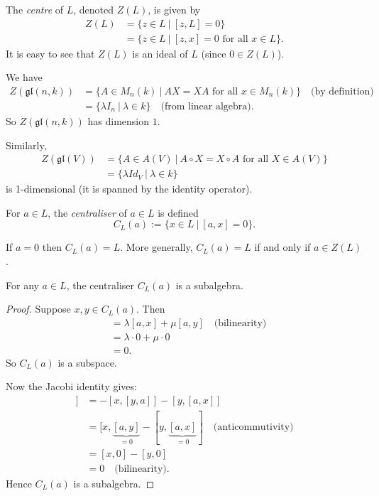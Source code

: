 \begin{definition}
	The \emph{centre} of $L$, denoted $Z(L)$, is given by
	\begin{align*}
		Z(L) &= \{z \in L\ |\ [z, L] = 0\} \\
			 &= \{z \in L\ |\ [z, x] = 0 \text{ for all } x \in L\}.
	\end{align*}
	It is easy to see that $Z(L)$ is an ideal of $L$ (since $0 \in Z(L)$).
\end{definition}

\begin{example}
	We have
	\begin{align*}
		Z(\mathfrak{gl}(n, k)) &= \{A \in M_n(k)\ |\ AX = XA \text{ for all } x \in M_n(k)\} \quad \text{(by definition)} \\
			&= \{\lambda I_n\ |\ \lambda \in k\} \quad \text{(from linear algebra)}.
	\end{align*}
	So $Z(\mathfrak{gl}(n, k))$ has dimension $1$.
	
	Similarly,
	\begin{align*}
		Z(\mathfrak{gl}(V)) &= \{A \in A(V)\ |\ A \circ X = X \circ A \text{ for all } X \in A(V)\} \\
			&= \{\lambda Id_V\ |\ \lambda \in k\}
	\end{align*}
	is 1-dimensional (it is spanned by the identity operator).
\end{example}

\begin{definition}
	For $a \in L$, the \emph{centraliser} of $a \in L$ is defined
	\[
		C_L(a) := \{x \in L\ |\ [a, x] = 0\}.
	\]
\end{definition}

\begin{remark}
	If $a = 0$ then $C_L(a) = L$. More generally, $C_L(a) = L$ if and only if $a \in Z(L)$.
\end{remark}

\begin{lemma}
	For any $a \in L$, the centraliser $C_L(a)$ is a subalgebra.
	\begin{proof}
		Suppose $x, y \in C_L(a)$. Then
		\begin{align*}
			[a, \lambda x + \mu y] &= \lambda[a, x] + \mu[a, y] \quad \text{(bilinearity)} \\
				&= \lambda \cdot 0 + \mu \cdot 0 \\
				&= 0.
		\end{align*}
		So $C_L(a)$ is a subspace.
		
		Now the Jacobi identity gives:
		\begin{align*}
			[a, [x, y]] &= -[x, [y, a]] - [y, [a, x]] \\
					   &= [x, \underbrace{[a, y]}_{= 0} - [y, \underbrace{[a, x]}_{= 0}] \quad \text{(anticommutivity)} \\
					   &= [x, 0] - [y, 0] \\
					   &= 0 \quad \text{(bilinearity)}.
		\end{align*}
		Hence $C_L(a)$ is a subalgebra.
	\end{proof}
\end{lemma}

